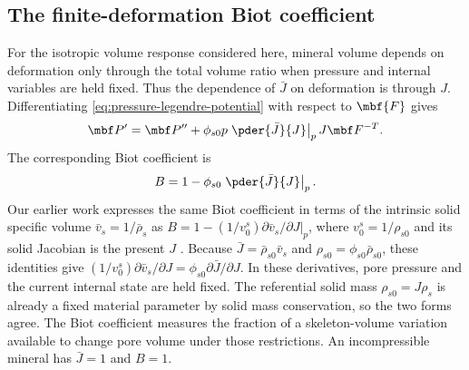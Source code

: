 \subsection{The finite-deformation Biot coefficient}
\label{sec:biot-coefficient-and-momentum}

For the isotropic volume response considered here, mineral volume depends
on deformation only through the total volume ratio when pressure and
internal variables are held fixed.  Thus the dependence of \(\bar J\) on
deformation is through \(J\).  Differentiating
\eqref{eq:pressure-legendre-potential} with respect to $\mbf{F}$ gives
\begin{equation*}
 \mbf P^{\prime}
 =\mbf P^{\prime\prime}
 +\phi_{s0}p\left.\pder{\bar J}{J}\right|_p
 J\mbf F^{-T}.
\end{equation*}
The corresponding Biot coefficient is
\begin{equation}
 B=1-\phi_{s0}\left.\pder{\bar J}{J}\right|_p.
 \label{eq:finite-deformation-biot-coefficient}
\end{equation}
Our earlier work expresses the same Biot coefficient in terms of the intrinsic
solid specific volume \(\bar v_s=1/\bar\rho_s\) as
\(B=1-(1/v_0^s)\left.\partial\bar v_s/\partial J\right|_p\), where
\(v_0^s=1/\rho_{s0}\) and its solid Jacobian is the present \(J\)
\citep[eq.~(39)]{fosterxu2025}.  Because
\(\bar J=\bar\rho_{s0}\bar v_s\) and
\(\rho_{s0}=\phi_{s0}\bar\rho_{s0}\), these identities give
\((1/v_0^s)\partial\bar v_s/\partial J
=\phi_{s0}\partial\bar J/\partial J\).  In these derivatives, pore pressure
and the current internal state are held fixed.  The referential solid mass
\(\rho_{s0}=J\rho_s\) is already a fixed material parameter by solid mass
conservation, so the two forms agree.  The
Biot coefficient measures the fraction of a skeleton-volume variation
available to change pore volume under those restrictions.  An incompressible
mineral has \(\bar J=1\) and \(B=1\).

